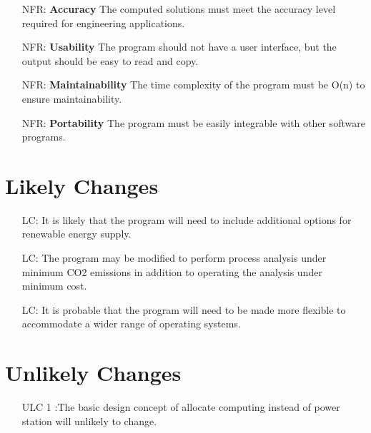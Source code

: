 \documentclass[12pt]{article}
\newcounter{nfrnum} %
\newcounter{lcnum} %
\begin{document}
\noindent \begin{itemize}

\item[NFR\refstepcounter{nfrnum}\thenfrnum \label{NFR_Accuracy}:]
  \textbf{Accuracy} {The computed solutions must meet the accuracy level required for engineering applications.}

\item[NFR\refstepcounter{nfrnum}\thenfrnum \label{NFR_Usability}:] \textbf{Usability}
  {The program should not have a user interface, but the output should be easy to read and copy.}

\item[NFR\refstepcounter{nfrnum}\thenfrnum \label{NFR_Maintainability}:]
  \textbf{Maintainability} { The time complexity of the program must be O(n) to ensure maintainability.}

\item[NFR\refstepcounter{nfrnum}\thenfrnum \label{NFR_Portability}:]
  \textbf{Portability} {The program must be easily integrable with other software programs.}


\end{itemize}

\section{Likely Changes}    

\noindent \begin{itemize}

\item[LC\refstepcounter{lcnum}\thelcnum\label{LC_meaningfulLabel}:] { It is likely that the program will need to include additional options for renewable energy supply.}
\item[LC\refstepcounter{lcnum}\thelcnum\label{LC_meaningfulLabel}:] {The program may be modified to perform process analysis under minimum CO2 emissions in addition to operating the analysis under minimum cost.}
\item[LC\refstepcounter{lcnum}\thelcnum\label{LC_meaningfulLabel}:] { It is probable that the program will need to be made more flexible to accommodate a wider range of operating systems.}
\end{itemize}

\section{Unlikely Changes}    

\noindent \begin{itemize}

\item[ULC 1\label{LC_meaningfulLabel}]:{The basic design concept of allocate computing instead of power station will unlikely to change.}

\end{itemize}
\end{document}
